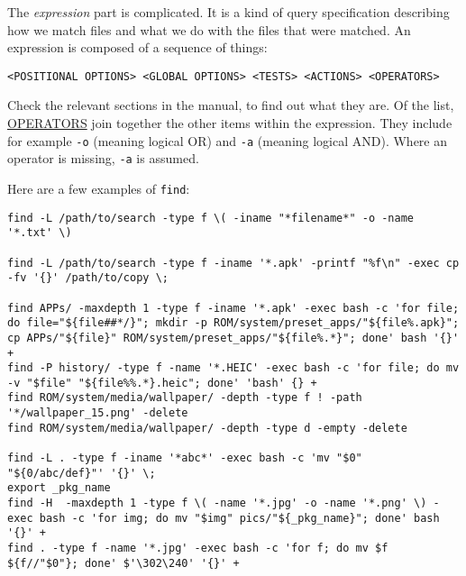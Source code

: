 The \textit{expression} part is complicated. It is a kind of query
specification describing how we match files and what we do with
the files that were matched. An expression is composed of a
sequence of things:

\begin{lstlisting}
<POSITIONAL OPTIONS> <GLOBAL OPTIONS> <TESTS> <ACTIONS> <OPERATORS>
\end{lstlisting}

Check the relevant sections in the manual, to find out what they
are. Of the list, \uline{OPERATORS} join together the other items
within the expression. They include for example \lstinline|-o|
(meaning logical OR) and \lstinline|-a| (meaning logical
AND). Where an operator is missing, \lstinline|-a| is assumed.

Here are a few examples of \lstinline|find|:

\begin{lstlisting}
find -L /path/to/search -type f \( -iname "*filename*" -o -name '*.txt' \)

find -L /path/to/search -type f -iname '*.apk' -printf "%f\n" -exec cp -fv '{}' /path/to/copy \;

find APPs/ -maxdepth 1 -type f -iname '*.apk' -exec bash -c 'for file; do file="${file##*/}"; mkdir -p ROM/system/preset_apps/"${file%.apk}"; cp APPs/"${file}" ROM/system/preset_apps/"${file%.*}"; done' bash '{}' +
find -P history/ -type f -name '*.HEIC' -exec bash -c 'for file; do mv -v "$file" "${file%%.*}.heic"; done' 'bash' {} +
find ROM/system/media/wallpaper/ -depth -type f ! -path '*/wallpaper_15.png' -delete
find ROM/system/media/wallpaper/ -depth -type d -empty -delete

find -L . -type f -iname '*abc*' -exec bash -c 'mv "$0" "${0/abc/def}"' '{}' \;
export _pkg_name
find -H  -maxdepth 1 -type f \( -name '*.jpg' -o -name '*.png' \) -exec bash -c 'for img; do mv "$img" pics/"${_pkg_name}"; done' bash '{}' +
find . -type f -name '*.jpg' -exec bash -c 'for f; do mv $f ${f//"$0"}; done' $'\302\240' '{}' +
\end{lstlisting}

